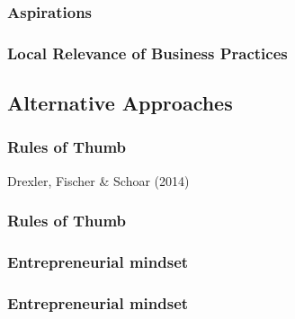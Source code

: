 \documentclass[hideothersubsections, usenames,dvipsnames,11pt]{beamer}
\newenvironment{itemize_2pt}{\itemize\addtolength{\itemsep}{2pt}}{\enditemize}
\begin{document}
\begin{frame}
\frametitle{Aspirations}
\begin{itemize_2pt}
	\item 
	\vspace{0.1in}
\end{itemize_2pt}
\end{frame}

\begin{frame}
\frametitle{Local Relevance of Business Practices}
\begin{itemize_2pt}
	\item 
	\vspace{0.1in}
\end{itemize_2pt}
\end{frame}


\subsection{Alternative Approaches}

\begin{frame}
\frametitle{Rules of Thumb}
	\begin{itemize_2pt}
	\item Drexler, Fischer \& Schoar (2014) \citep{Drexler2014}
	\vspace{0.1in}
	\end{itemize_2pt}
\end{frame}

\begin{frame}
\frametitle{Rules of Thumb}
	\begin{itemize_2pt}
	\item \citep{Arraiz2019} \citep{Cole2019}
	\vspace{0.1in}
	\end{itemize_2pt}
\end{frame}

%

\begin{frame}
\frametitle{Entrepreneurial mindset}
	\begin{itemize_2pt}
	\item \citep{Campos2017}
	\vspace{0.1in}
	\end{itemize_2pt}
\end{frame}

\begin{frame}
\frametitle{Entrepreneurial mindset}
	\begin{itemize_2pt}
	\item \citep{Alibhai2019} \citep{Ubfal2019}
	\vspace{0.1in}
	\end{itemize_2pt}
\end{frame}
\end{document}
